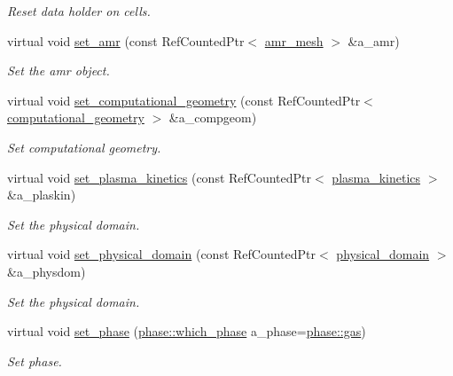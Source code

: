 \begin{DoxyCompactItemize}
\begin{DoxyCompactList}\small\item\em Reset data holder on cells. \end{DoxyCompactList}\item 
virtual void \hyperlink{classsigma__solver_a3e21f23656fb46b4c182ea9abedd3069}{set\+\_\+amr} (const Ref\+Counted\+Ptr$<$ \hyperlink{classamr__mesh}{amr\+\_\+mesh} $>$ \&a\+\_\+amr)
\begin{DoxyCompactList}\small\item\em Set the amr object. \end{DoxyCompactList}\item 
virtual void \hyperlink{classsigma__solver_a72fa94b9e41ea091d618307172e3a5c2}{set\+\_\+computational\+\_\+geometry} (const Ref\+Counted\+Ptr$<$ \hyperlink{classcomputational__geometry}{computational\+\_\+geometry} $>$ \&a\+\_\+compgeom)
\begin{DoxyCompactList}\small\item\em Set computational geometry. \end{DoxyCompactList}\item 
virtual void \hyperlink{classsigma__solver_a9056d866dc9f932b16debbf52c838ca0}{set\+\_\+plasma\+\_\+kinetics} (const Ref\+Counted\+Ptr$<$ \hyperlink{classplasma__kinetics}{plasma\+\_\+kinetics} $>$ \&a\+\_\+plaskin)
\begin{DoxyCompactList}\small\item\em Set the physical domain. \end{DoxyCompactList}\item 
virtual void \hyperlink{classsigma__solver_a4238f9a51b2b3fbec4c2ec32b92d728a}{set\+\_\+physical\+\_\+domain} (const Ref\+Counted\+Ptr$<$ \hyperlink{classphysical__domain}{physical\+\_\+domain} $>$ \&a\+\_\+physdom)
\begin{DoxyCompactList}\small\item\em Set the physical domain. \end{DoxyCompactList}\item 
virtual void \hyperlink{classsigma__solver_a41120a8437095fe1ea34f69e43b5b749}{set\+\_\+phase} (\hyperlink{namespacephase_a23c76f548a5eb1955ed8c929c541108b}{phase\+::which\+\_\+phase} a\+\_\+phase=\hyperlink{namespacephase_a23c76f548a5eb1955ed8c929c541108bad0a7c1eb8fd916c8b7ec85be0fd23b38}{phase\+::gas})
\begin{DoxyCompactList}\small\item\em Set phase. \end{DoxyCompactList}\item 

\end{DoxyCompactItemize}
